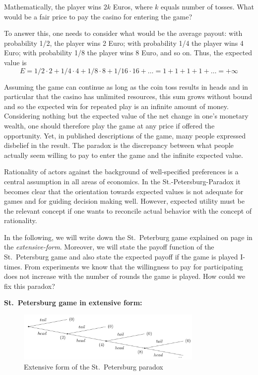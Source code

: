 \documentclass[
  12pt,
  oneside]{book}
\theoremstyle{definition}
\theoremstyle{definition}
\theoremstyle{definition}
\theoremstyle{definition}
\theoremstyle{remark}
\begin{document}
Mathematically, the player wins \(2k\) Euros, where \(k\) equals number of tosses. What would be a fair price to pay the casino for entering the game?

To answer this, one needs to consider what would be the average payout: with probability 1/2, the player wins 2 Euro; with probability 1/4 the player wins 4 Euro; with probability 1/8 the player wins 8 Euro, and so on. Thus, the expected value is \[E = 1/2 \cdot 2 + 1/4 \cdot 4 + 1/8 \cdot 8+ 1/16 \cdot 16 + \dots = 1 + 1 + 1 + 1 + \dots = + \infty \]

Assuming the game can continue as long as the coin toss results in heads and in particular that the casino has unlimited resources, this sum grows without bound and so the expected win for repeated play is an infinite amount of money. Considering nothing but the expected value of the net change in one's monetary wealth, one should therefore play the game at any price if offered the opportunity. Yet, in published descriptions of the game, many people expressed disbelief in the result. The paradox is the discrepancy between what people actually seem willing to pay to enter the game and the infinite expected value.

Rationality of actors against the background of well-specified preferences is a central assumption in all areas of economics. In the St.-Petersburg-Paradox it becomes clear that the orientation towards expected values is not adequate for games and for guiding decision making well. However, expected utility must be the relevant concept if one wants to reconcile actual behavior with the concept of rationality.

In the following, we will write down the St.~Peterburg game explained on page in the \emph{extensive-form}.
Moreover, we will state the payoff function of the St.~Petersburg game and also state the expected payoff if the game is played I-times.
From experiments we know that the willingness to pay for participating does not increase with the number of rounds the game is played. How could we fix this paradox?

\textbf{St.~Petersburg game in extensive form:}

\begin{figure}
\centering
\includegraphics[width=0.8\textwidth,height=\textheight]{fig/spextensiveform.png}
\caption{\label{fig:spextensiveform} Extensive form of the St.~Petersburg paradox}
\end{figure}
\end{document}
